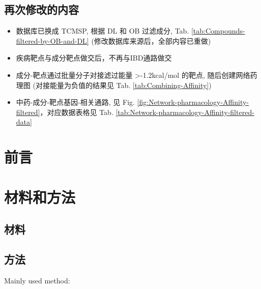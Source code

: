 \documentclass[
]{article}
\providecommand{\tightlist}{%
  \setlength{\itemsep}{0pt}\setlength{\parskip}{0pt}}
\begin{document}
\hypertarget{ux518dux6b21ux4feeux6539ux7684ux5185ux5bb9}{%
\subsection{再次修改的内容}\label{ux518dux6b21ux4feeux6539ux7684ux5185ux5bb9}}

\begin{itemize}
\tightlist
\item
  数据库已换成 TCMSP, 根据 DL 和 OB 过滤成分, Tab. \ref{tab:Compounds-filtered-by-OB-and-DL}
  (修改数据库来源后，全部内容已重做)
\item
  疾病靶点与成分靶点做交后，不再与IBD通路做交
\item
  成分-靶点通过批量分子对接滤过能量 \textgreater-1.2kcal/mol 的靶点,
  随后创建网络药理图 (对接能量为负值的结果见 Tab. \ref{tab:Combining-Affinity})
\item
  中药-成分-靶点基因-相关通路, 见 Fig. \ref{fig:Network-pharmacology-Affinity-filtered}，对应数据表格见
  Tab. \ref{tab:Network-pharmacology-Affinity-filtered-data}
\end{itemize}

\hypertarget{introduction}{%
\section{前言}\label{introduction}}

\hypertarget{methods}{%
\section{材料和方法}\label{methods}}

\hypertarget{ux6750ux6599}{%
\subsection{材料}\label{ux6750ux6599}}

\hypertarget{ux65b9ux6cd5}{%
\subsection{方法}\label{ux65b9ux6cd5}}

Mainly used method:
\end{document}
